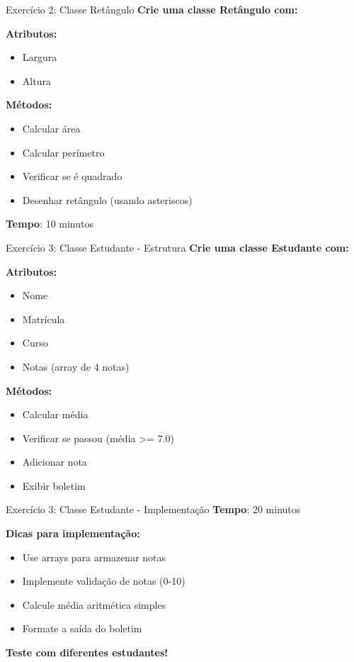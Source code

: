 \documentclass[aspectratio=169]{beamer}
\begin{document}
\begin{frame}{Exercício 2: Classe Retângulo}
\textbf{Crie uma classe Retângulo com:}

\textbf{Atributos:}
\begin{itemize}
\item Largura
\item Altura
\end{itemize}

\textbf{Métodos:}
\begin{itemize}
\item Calcular área
\item Calcular perímetro
\item Verificar se é quadrado
\item Desenhar retângulo (usando asteriscos)
\end{itemize}

\vspace{0.3cm}
\textbf{Tempo}: 10 minutos
\end{frame}

\begin{frame}{Exercício 3: Classe Estudante - Estrutura}
\textbf{Crie uma classe Estudante com:}

\textbf{Atributos:}
\begin{itemize}
\item Nome
\item Matrícula
\item Curso
\item Notas (array de 4 notas)
\end{itemize}

\vspace{0.5cm}
\textbf{Métodos:}
\begin{itemize}
\item Calcular média
\item Verificar se passou (média >= 7.0)
\item Adicionar nota
\item Exibir boletim
\end{itemize}
\end{frame}

\begin{frame}{Exercício 3: Classe Estudante - Implementação}
\textbf{Tempo}: 20 minutos

\vspace{0.5cm}
\textbf{Dicas para implementação:}
\begin{itemize}
\item Use arrays para armazenar notas
\item Implemente validação de notas (0-10)
\item Calcule média aritmética simples
\item Formate a saída do boletim
\end{itemize}

\vspace{0.3cm}
\textbf{Teste com diferentes estudantes!}
\end{frame}
\end{document}
